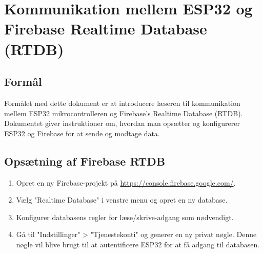 \section{Kommunikation mellem ESP32 og Firebase Realtime Database (RTDB)}

\subsection*{Formål}
Formålet med dette dokument er at introducere læseren til kommunikation mellem ESP32 mikrocontrolleren og Firebase's Realtime Database (RTDB). Dokumentet giver instruktioner om, hvordan man opsætter og konfigurerer ESP32 og Firebase for at sende og modtage data.

\subsection*{Opsætning af Firebase RTDB}
\begin{enumerate}
	\item Opret en ny Firebase-projekt på \url{https://console.firebase.google.com/}.
	\item Vælg "Realtime Database" i venstre menu og opret en ny database.
	\item Konfigurer databasens regler for læse/skrive-adgang som nødvendigt.
	\item Gå til "Indstillinger" > "Tjenestekonti" og generer en ny privat nøgle. Denne nøgle vil blive brugt til at autentificere ESP32 for at få adgang til databasen.
\end{enumerate}

